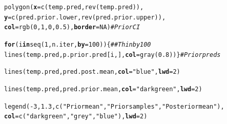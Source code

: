 \documentclass[color=usenames,dvipsnames]{beamer}\usepackage[]{graphicx}\usepackage[]{xcolor}
\makeatletter
\newcommand{\hlnum}[1]{\textcolor[rgb]{0.69,0.494,0}{#1}}%
\newcommand{\hlsng}[1]{\textcolor[rgb]{0.749,0.012,0.012}{#1}}%
\newcommand{\hlcom}[1]{\textcolor[rgb]{0.514,0.506,0.514}{\textit{#1}}}%
\newcommand{\hlopt}[1]{\textcolor[rgb]{0,0,0}{#1}}%
\newcommand{\hldef}[1]{\textcolor[rgb]{0,0,0}{#1}}%
\newcommand{\hlkwa}[1]{\textcolor[rgb]{0,0,0}{\textbf{#1}}}%
\newcommand{\hlkwc}[1]{\textcolor[rgb]{0,0,0}{\textbf{#1}}}%
\newcommand{\hlkwd}[1]{\textcolor[rgb]{0.004,0.004,0.506}{#1}}%
\newenvironment{kframe}{%
 \def\at@end@of@kframe{}%
 \ifinner\ifhmode%
  \def\at@end@of@kframe{\end{minipage}}%
  \begin{minipage}{\columnwidth}%
 \fi\fi%
 \def\FrameCommand##1{\hskip\@totalleftmargin \hskip-\fboxsep
 \colorbox{shadecolor}{##1}\hskip-\fboxsep
     \hskip-\linewidth \hskip-\@totalleftmargin \hskip\columnwidth}%
 \MakeFramed {\advance\hsize-\width
   \@totalleftmargin\z@ \linewidth\hsize
   \@setminipage}}%
 {\par\unskip\endMakeFramed%
 \at@end@of@kframe}
\newenvironment{knitrout}{}{} %
\makeatother
\begin{document}
\begin{frame}[fragile]
\begin{knitrout}
\begin{kframe}
{\ttfamily\noindent\bfseries\color{errorcolor}{\#\# Error in polygon(x = c(temp.pred, rev(temp.pred)), y = c(pred.post.lower, : plot.new has not been called yet}}\begin{alltt}
\hlkwd{polygon}\hldef{(}\hlkwc{x}\hldef{=}\hlkwd{c}\hldef{(temp.pred,} \hlkwd{rev}\hldef{(temp.pred)),}
        \hlkwc{y}\hldef{=}\hlkwd{c}\hldef{(pred.prior.lower,} \hlkwd{rev}\hldef{(pred.prior.upper)),}
        \hlkwc{col}\hldef{=}\hlkwd{rgb}\hldef{(}\hlnum{0}\hldef{,}\hlnum{1}\hldef{,}\hlnum{0}\hldef{,}\hlnum{0.5}\hldef{),} \hlkwc{border}\hldef{=}\hlnum{NA}\hldef{)}                   \hlcom{# Prior CI}
\end{alltt}


{\ttfamily\noindent\bfseries\color{errorcolor}{\#\# Error: object 'pred.prior.lower' not found}}\begin{alltt}
\hlkwa{for}\hldef{(i} \hlkwa{in} \hlkwd{seq}\hldef{(}\hlnum{1}\hldef{, n.iter,} \hlkwc{by}\hldef{=}\hlnum{100}\hldef{)) \{}  \hlcom{## Thin by 100}
    \hlkwd{lines}\hldef{(temp.pred, p.prior.pred[i,],} \hlkwc{col}\hldef{=}\hlkwd{gray}\hldef{(}\hlnum{0.8}\hldef{))  \}} \hlcom{# Prior preds}
\end{alltt}


{\ttfamily\noindent\bfseries\color{errorcolor}{\#\# Error: object 'n.iter' not found}}\begin{alltt}
\hlkwd{lines}\hldef{(temp.pred, pred.post.mean,} \hlkwc{col}\hldef{=}\hlsng{"blue"}\hldef{,} \hlkwc{lwd}\hldef{=}\hlnum{2}\hldef{)}
\end{alltt}


{\ttfamily\noindent\bfseries\color{errorcolor}{\#\# Error in plot.xy(xy.coords(x, y), type = type, ...): plot.new has not been called yet}}\begin{alltt}
\hlkwd{lines}\hldef{(temp.pred, pred.prior.mean,} \hlkwc{col}\hldef{=}\hlsng{"darkgreen"}\hldef{,} \hlkwc{lwd}\hldef{=}\hlnum{2}\hldef{)}
\end{alltt}


{\ttfamily\noindent\bfseries\color{errorcolor}{\#\# Error: object 'pred.prior.mean' not found}}\begin{alltt}
\hlkwd{legend}\hldef{(}\hlopt{-}\hlnum{3}\hldef{,} \hlnum{1.3}\hldef{,} \hlkwd{c}\hldef{(}\hlsng{"Prior mean"}\hldef{,} \hlsng{"Prior samples"}\hldef{,} \hlsng{"Posterior mean"}\hldef{),}
       \hlkwc{col}\hldef{=}\hlkwd{c}\hldef{(}\hlsng{"darkgreen"}\hldef{,} \hlsng{"grey"}\hldef{,} \hlsng{"blue"}\hldef{),} \hlkwc{lwd}\hldef{=}\hlnum{2}\hldef{)}
\end{alltt}


{\ttfamily\noindent\bfseries{}}\end{kframe}
\end{knitrout}
\end{frame}
\end{document}
